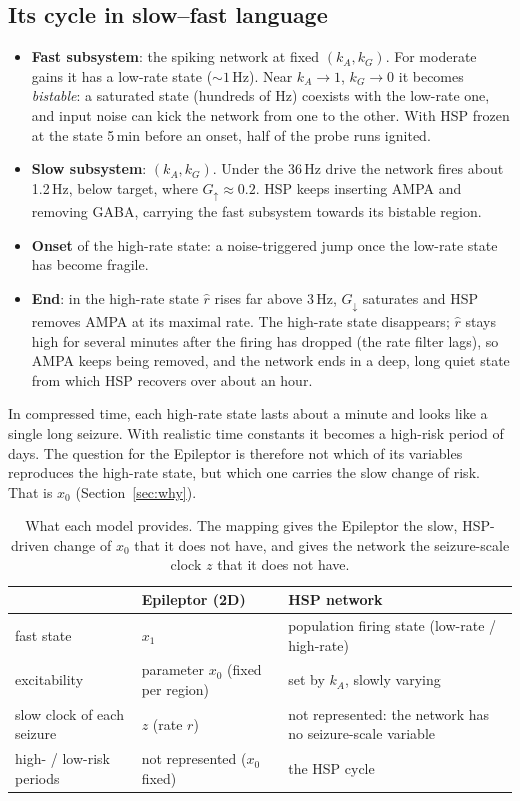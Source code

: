 \documentclass[11pt]{article}
\newcommand{\kA}{k_A}
\newcommand{\kG}{k_G}
\begin{document}
\subsection{Its cycle in slow--fast language}\label{sec:slowfast}
\begin{itemize}
\item \textbf{Fast subsystem}: the spiking network at fixed $(\kA, \kG)$. For moderate gains it has a low-rate state
($\sim1$\,Hz). Near $\kA\to1$, $\kG\to0$ it becomes \emph{bistable}: a saturated state (hundreds of Hz) coexists with the
low-rate one, and input noise can kick the network from one to the other. With HSP frozen at the state 5\,min before
an onset, half of the probe runs ignited.
\item \textbf{Slow subsystem}: $(\kA,\kG)$. Under the 36\,Hz drive the network fires about 1.2\,Hz, below target, where
$G_\uparrow\approx0.2$. HSP keeps inserting AMPA and removing GABA, carrying the fast subsystem towards its bistable
region.
\item \textbf{Onset} of the high-rate state: a noise-triggered jump once the low-rate state has become fragile.
\item \textbf{End}: in the high-rate state $\hat r$ rises far above 3\,Hz, $G_\downarrow$ saturates and HSP removes AMPA
at its maximal rate. The high-rate state disappears; $\hat r$ stays high for several minutes after the firing has
dropped (the rate filter lags), so AMPA keeps being removed, and the network ends in a deep, long quiet state from which
HSP recovers over about an hour.
\end{itemize}
In compressed time, each high-rate state lasts about a minute and looks like a single long seizure. With realistic
time constants it becomes a high-risk period of days. The question for the Epileptor is therefore not which of its
variables reproduces the high-rate state, but which one carries the slow change of risk. That is $x_0$
(Section~\ref{sec:why}).

\begin{table}[H]\centering\small
\begin{tabular}{p{3.6cm}p{5.4cm}p{5.6cm}}
\toprule
 & Epileptor (2D) & HSP network \\
\midrule
fast state & $x_1$ & population firing state (low-rate / high-rate) \\
excitability & parameter $x_0$ (fixed per region) & set by $\kA$, slowly varying \\
slow clock of each seizure & $z$ (rate $r$) & not represented: the network has no seizure-scale variable \\
high- / low-risk periods & not represented ($x_0$ fixed) & the HSP cycle \\
\bottomrule
\end{tabular}
\caption{What each model provides. The mapping gives the Epileptor the slow, HSP-driven change of $x_0$ that it does not
have, and gives the network the seizure-scale clock $z$ that it does not have.}
\end{table}
\end{document}
